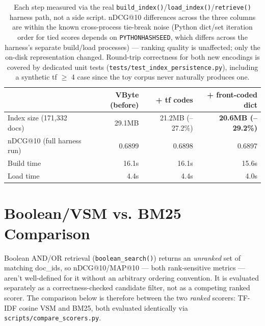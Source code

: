 \documentclass[11pt]{article}
\begin{document}
\begin{table}[h]
\centering
\begin{tabular}{lrrr}
\toprule
 & VByte (before) & + tf codes & + front-coded dict \\
\midrule
Index size (171{,}332 docs) & 29.1MB & 21.2MB (--27.2\%) & \textbf{20.6MB (--29.2\%)} \\
nDCG@10 (full harness run) & 0.6899 & 0.6898 & 0.6897 \\
Build time & 16.1s & 16.1s & 15.6s \\
Load time & 4.4s & 4.4s & 4.0s \\
\bottomrule
\end{tabular}
\caption{Each step measured via the real
\texttt{build\_index()}/\texttt{load\_index()}/\texttt{retrieve()}
harness path, not a side script. nDCG@10 differences across the three
columns are within the known cross-process tie-break noise (Python
dict/set iteration order for tied scores depends on
\texttt{PYTHONHASHSEED}, which differs across the harness's separate
build/load processes) --- ranking quality is unaffected; only the
on-disk representation changed. Round-trip correctness for both new encodings is
covered by dedicated unit tests
(\texttt{tests/test\_index\_persistence.py}), including a synthetic
tf $\ge$ 4 case since the toy corpus never naturally produces one.}
\end{table}

\section{Boolean/VSM vs. BM25 Comparison}

Boolean AND/OR retrieval (\texttt{boolean\_search()}) returns an
\emph{unranked} set of matching doc\_ids, so nDCG@10/MAP@10 --- both
rank-sensitive metrics --- aren't well-defined for it without an
arbitrary ordering convention. It is evaluated separately as a
correctness-checked candidate filter, not as a competing ranked scorer.
The comparison below is therefore between the two \emph{ranked} scorers:
TF-IDF cosine VSM and BM25, both evaluated identically via
\texttt{scripts/compare\_scorers.py}.
\end{document}
